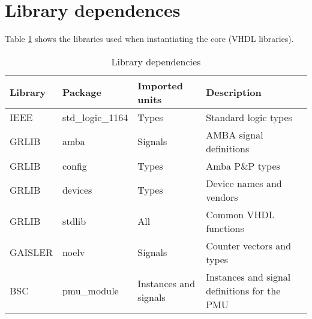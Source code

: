 \section{Library dependences}
Table \ref{dep_tab} shows the libraries used when instantiating the core (VHDL libraries).\\
\begin{table}[H]
	\caption{Library dependencies}
	\label{dep_tab}
	\centering
	\begin{tabular}{|l|l|l|l|}
		\hline
		\textbf{Library} & \textbf{Package}  & \textbf{Imported units}  & \textbf{Description} \\
		\hline
		IEEE & std\_logic\_1164 & Types & Standard logic types\\
		\hline
		GRLIB & amba & Signals & AMBA signal definitions\\
		\hline
		GRLIB & config & Types & Amba P\&P types\\
		\hline
		GRLIB & devices  & Types  & Device names and vendors \\
		\hline
		GRLIB & stdlib &  All & Common VHDL functions\\
		\hline
		GAISLER & noelv & Signals & Counter vectors and types \\
		\hline
		BSC & pmu\_module & Instances and signals & Instances and signal definitions for the PMU\\
		\hline
	\end{tabular}
\end{table}
